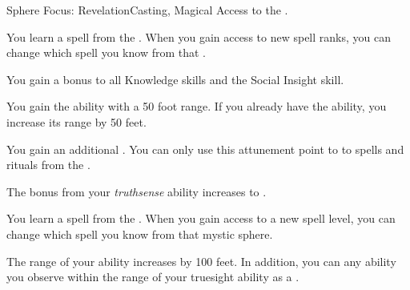     \begin{feat}{Sphere Focus: Revelation}{Casting, Magical}
        \featpre Access to the  .

         You learn a spell from the  .
        When you gain access to new spell ranks, you can change which spell you know from that .

         You gain a  bonus to all Knowledge skills and the Social Insight skill.

         You gain the  ability with a 50 foot range.
        If you already have the  ability, you increase its range by 50 feet.

         You gain an additional .
        You can only use this attunement point to  to spells and rituals from the  .

         The bonus from your \textit{truthsense} ability increases to .

         You learn a spell from the  .
        When you gain access to a new spell level, you can change which spell you know from that mystic sphere.

         The range of your  ability increases by 100 feet.
        In addition, you can  any  ability you observe within the range of your truesight ability as a .
    \end{feat}

